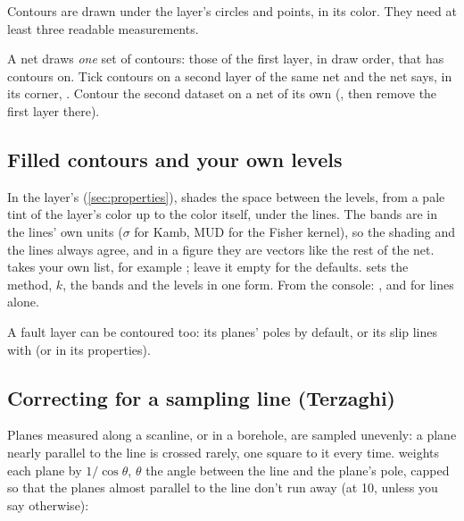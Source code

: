 Contours are drawn under the layer's circles and points, in its color. They need at least three readable
measurements.

\begin{caution}
A net draws \emph{one} set of contours: those of the first layer, in draw order, that has contours on.
Tick contours on a second layer of the same net and the net says, in its corner,
. Contour the second
dataset on a net of its own (, then remove the first layer there).
\end{caution}

\subsection{Filled contours and your own levels}

In the layer's  (\cref{sec:properties}),  shades the space between the
levels, from a pale tint of the layer's color up to the color itself, under the lines. The bands are in
the lines' own units ($\sigma$ for Kamb, MUD for the Fisher kernel), so the shading and the lines always
agree, and in a figure they are vectors like the rest of the net.  takes your own list, for
example ; leave it empty for the defaults.  sets the method,
$k$, the bands and the levels in one form. From the console:
, and  for lines alone.

A fault layer can be contoured too: its planes' poles by default, or its slip lines with
 (or  in its properties).

\subsection{Correcting for a sampling line (Terzaghi)}\label{sec:terzaghi}

Planes measured along a scanline, or in a borehole, are sampled unevenly: a plane nearly parallel to the
line is crossed rarely, one square to it every time. \textcite{terzaghi1965} weights each plane by
$1/\cos\theta$, $\theta$ the angle between the line and the plane's pole, capped so that the planes almost
parallel to the line don't run away (at 10, unless you say otherwise):

